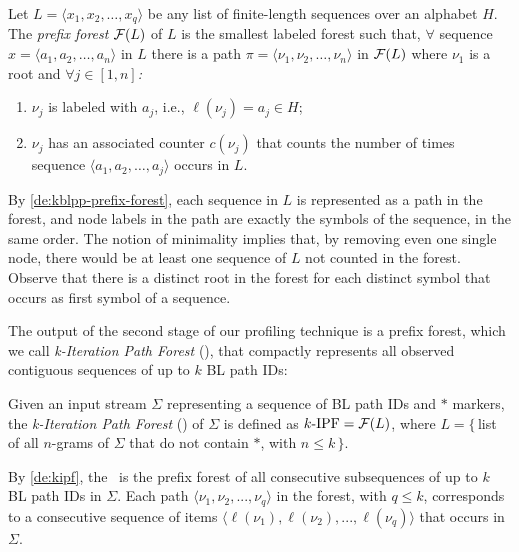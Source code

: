 \begin{definition}
\label{de:kblpp-prefix-forest}
Let $L=\langle x_1, x_2, \ldots, x_q\rangle$ be any list of finite-length sequences over an alphabet $H$. The {\em prefix forest} ${\cal F}(L)$ of $L$ is the smallest labeled forest such that, $\forall$ sequence $x=\langle a_1, a_2, \ldots, a_n\rangle$ in $L$ there is a path $\pi=\langle \nu_1, \nu_2, \ldots, \nu_n\rangle$ in ${\cal F}(L)$ where $\nu_1$ is a root and $\forall j\in[1,n]${\em :}
\begin{enumerate}
\item $\nu_j$ is labeled with $a_j$, i.e., $\ell(\nu_j)=a_j\in H$;
\item $\nu_j$ has an associated counter $c(\nu_j)$ that counts the number of times sequence $\langle a_1, a_2, \ldots, a_j\rangle$ occurs in $L$.
\end{enumerate}
\end{definition}

\noindent By \mydefinition\ref{de:kblpp-prefix-forest}, each sequence in $L$ is represented as a path in the forest, and node labels in the path are exactly the symbols of the sequence, in the same order. The notion of minimality implies that, by removing even one single node, there would be at least one sequence of $L$ not counted in the forest. Observe that there is a distinct root in the forest for each distinct symbol that occurs as first symbol of a sequence.

The output of the second stage of our profiling technique is a prefix forest, which we call {\em k-Iteration Path Forest} (\kipf), that compactly represents all observed contiguous sequences of up to $k$ BL path IDs:

\begin{definition}
\label{de:kipf}
Given an input stream $\Sigma$ representing a sequence of BL path IDs and $*$ markers, the {\em k-Iteration Path Forest} (\kipf) of $\Sigma$ is defined as $\mbox{$k$-IPF}={\cal F}(L)$, where $L=\{$\,list of all $n$-grams of $\Sigma$ that do not contain $*$, with $n\le k\,\}$.
\end{definition}

\noindent By \mydefinition\ref{de:kipf}, the \kipf\ is the prefix forest of all consecutive subsequences of up to $k$ BL path IDs in $\Sigma$. Each path $\langle\nu_1, \nu_2, ..., \nu_q\rangle$ in the forest, with $q\le k$, corresponds to a consecutive sequence of items $\langle\ell(\nu_1), \ell(\nu_2), ..., \ell(\nu_q)\rangle$ that occurs in $\Sigma$.

